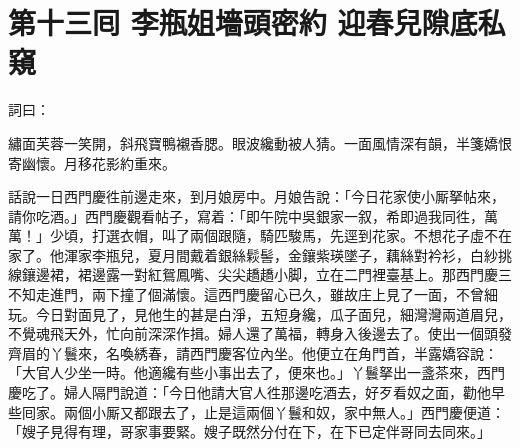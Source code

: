 
\chapter*{第十三囘 李瓶姐墻頭密約 迎春兒隙底私窺}


詞曰：

\begin{myquote}
繡面芙蓉一笑開，斜飛寶鴨襯香腮。眼波纔動被人猜。一面風情深有韻，半箋嬌恨寄幽懷。月移花影約重來。

\end{myquote}

話說一日西門慶徃前邊走來，到月娘房中。月娘告說：「今日花家使小厮拏帖來，請你吃酒。」西門慶觀看帖子，寫着：「即午院中吳銀家一叙，希即過我同徃，萬萬！」少頃，打選衣帽，叫了兩個跟隨，騎匹駿馬，先逕到花家。不想花子虛不在家了。他渾家李瓶兒，夏月間戴着銀絲鬏髻，金鑲紫瑛墜子，藕絲對衿衫，白紗挑線鑲邊裙，裙邊露一對紅鴛鳳嘴、尖尖趫趫小脚，立在二門裡臺基上。那西門慶三不知走進門，兩下撞了個滿懷。{}這西門慶留心已久，雖故庄上見了一面，不曾細玩。今日對面見了，見他生的甚是白淨，五短身纔，瓜子面兒，細灣灣兩道眉兒，不覺魂飛天外，忙向前深深作揖。婦人還了萬福，轉身入後邊去了。使出一個頭發齊眉的丫鬟來，名喚綉春，請西門慶客位內坐。他便立在角門首，半露嬌容說：「大官人少坐一時。他適纔有些小事出去了，便來也。」丫鬟拏出一盞茶來，西門慶吃了。婦人隔門說道：「今日他請大官人徃那邊吃酒去，好歹看奴之面，{}勸他早些囘家。兩個小厮又都跟去了，止是這兩個丫鬟和奴，家中無人。」{}西門慶便道：「嫂子見得有理，哥家事要緊。嫂子既然分付在下，在下已定伴哥同去同來。」

